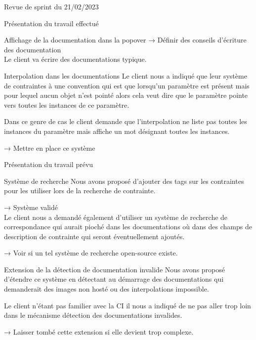 \documentclass[]{article}
\begin{document}
{\begin{section}{Revue de sprint du 21/02/2023}
\begin{subsection}{Présentation du travail effectué}
\begin{subsubsection}{Affichage de la documentation dans la popover}
         → Définir des conseils d’écriture des documentation
         \\[5mm]
         Le client va écrire des documentations typique.
     \end{subsubsection}

     \newpage

     \begin{subsubsection}{Interpolation dans les documentations}
         Le client nous a indiqué que leur système de contraintes à une convention qui est que lorsqu’un paramètre est présent mais pour lequel aucun objet n’est pointé alors cela veut dire que le paramètre pointe vers toutes les instances de ce paramètre.

         Dans ce genre de cas le client demande que l’interpolation ne liste pas toutes les instances du paramètre mais affiche un mot désignant toutes les instances.

         → Mettre en place ce système
     \end{subsubsection}
 \end{subsection}

 \begin{subsection}{Présentation du travail prévu}
     \begin{subsubsection}{Système de recherche}
         Nous avons proposé d’ajouter des tags sur les contraintes pour les utiliser lors de la recherche de contrainte.

         → Système validé
         \\[5mm]
         Le client nous a demandé également d’utiliser un système de recherche de correspondance qui aurait pioché dans les documentations où dans des champs de description de contrainte qui seront éventuellement ajoutés.

         → Voir si un tel système de recherche open-source existe.
     \end{subsubsection}

     \begin{subsubsection}{Extension de la détection de documentation invalide}
         Nous avons proposé d’étendre ce système en détectant au démarrage des documentations qui demanderait des images non hosté ou des interpolations impossible.

         Le client n’étant pas familier avec la CI il nous a indiqué de ne pas aller trop loin dans le mécanisme détection des documentations invalides.

         → Laisser tombé cette extension si elle devient trop complexe.
     \end{subsubsection}
 \end{subsection}


\end{section}}
\end{document}

